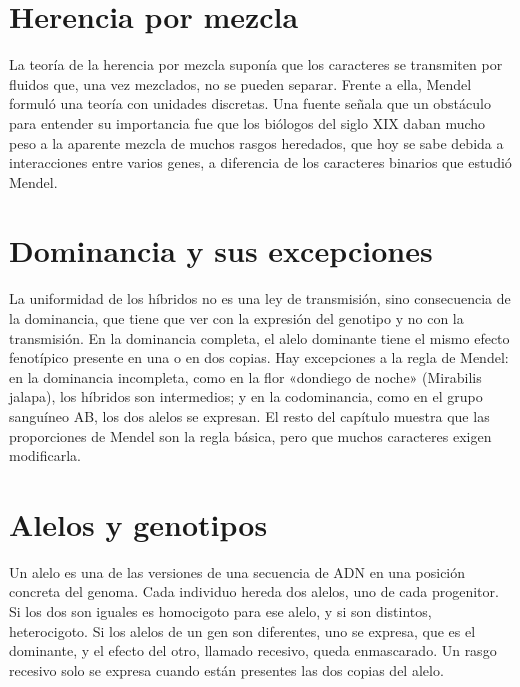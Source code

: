 \documentclass{book}
\begin{document}

\section{Herencia por mezcla}

La teoría de la herencia por mezcla suponía que los caracteres se transmiten por fluidos que, una vez mezclados, no se pueden separar. Frente a ella, Mendel formuló una teoría con unidades discretas. Una fuente señala que un obstáculo para entender su importancia fue que los biólogos del siglo XIX daban mucho peso a la aparente mezcla de muchos rasgos heredados, que hoy se sabe debida a interacciones entre varios genes, a diferencia de los caracteres binarios que estudió Mendel.


\section{Dominancia y sus excepciones}

La uniformidad de los híbridos no es una ley de transmisión, sino consecuencia de la dominancia, que tiene que ver con la expresión del genotipo y no con la transmisión. En la dominancia completa, el alelo dominante tiene el mismo efecto fenotípico presente en una o en dos copias. Hay excepciones a la regla de Mendel: en la dominancia incompleta, como en la flor «dondiego de noche» (Mirabilis jalapa), los híbridos son intermedios; y en la codominancia, como en el grupo sanguíneo AB, los dos alelos se expresan. El resto del capítulo muestra que las proporciones de Mendel son la regla básica, pero que muchos caracteres exigen modificarla.


\section{Alelos y genotipos}

Un alelo es una de las versiones de una secuencia de ADN en una posición concreta del genoma. Cada individuo hereda dos alelos, uno de cada progenitor. Si los dos son iguales es homocigoto para ese alelo, y si son distintos, heterocigoto. Si los alelos de un gen son diferentes, uno se expresa, que es el dominante, y el efecto del otro, llamado recesivo, queda enmascarado. Un rasgo recesivo solo se expresa cuando están presentes las dos copias del alelo.
\end{document}
